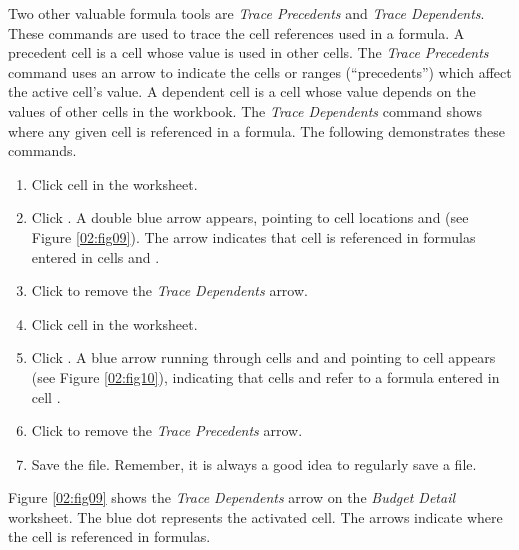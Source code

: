 Two other valuable formula tools are \textit{Trace Precedents} and \textit{Trace Dependents}. These commands are used to trace the cell references used in a formula. A precedent cell is a cell whose value is used in other cells. The \textit{Trace Precedents} command uses an arrow to indicate the cells or ranges (``precedents'') which affect the active cell's value. A dependent cell is a cell whose value depends on the values of other cells in the workbook. The \textit{Trace Dependents} command shows where any given cell is referenced in a formula. The following demonstrates these commands.

\begin{enumbox}
	\begin{enumerate}
		\item Click cell  in the  worksheet.
		\item Click . A double blue arrow appears, pointing to cell locations  and  (see Figure \ref{02:fig09}). The arrow indicates that cell  is referenced in formulas entered in cells  and .
		\item Click  to remove the \textit{Trace Dependents} arrow.
		\item Click cell  in the  worksheet.
		\item Click . A blue arrow running through cells  and  and pointing to cell  appears (see Figure \ref{02:fig10}), indicating that cells  and  refer to a formula entered in cell .
		\item Click  to remove the \textit{Trace Precedents} arrow.
		\item Save the  file. Remember, it is always a good idea to regularly save a file.
	\end{enumerate}
\end{enumbox}

Figure \ref{02:fig09} shows the \textit{Trace Dependents} arrow on the \textit{Budget Detail} worksheet. The blue dot represents the activated cell. The arrows indicate where the cell is referenced in formulas.

